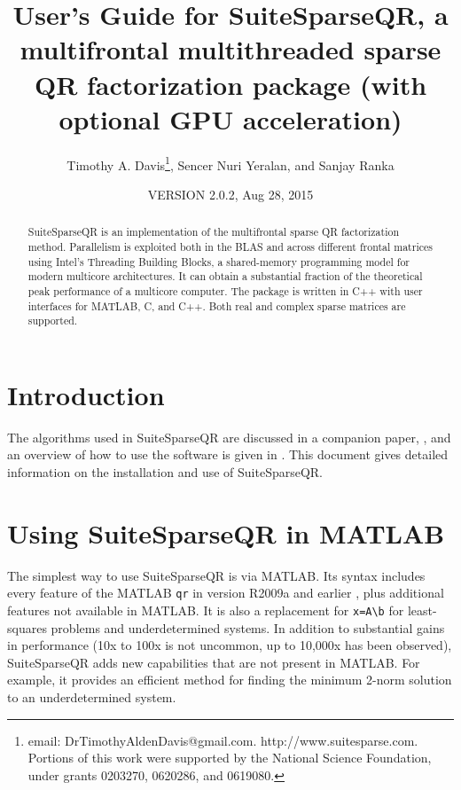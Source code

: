 \documentclass[12pt]{article}
\title{User's Guide for SuiteSparseQR, a multifrontal multithreaded sparse
QR factorization package (with optional GPU acceleration)}
\author{Timothy A. Davis\thanks{
email: DrTimothyAldenDavis@gmail.com.
http://www.suitesparse.com.
Portions of this work were supported by the National
Science Foundation, under grants 0203270, 0620286, and 0619080.},
Sencer Nuri Yeralan, and Sanjay Ranka}
\date{VERSION 2.0.2, Aug 28, 2015}
\begin{document}
\maketitle

\begin{abstract}

SuiteSparseQR is an implementation of the multifrontal sparse QR factorization
method.  Parallelism is exploited both in the BLAS and across different frontal
matrices using Intel's Threading Building Blocks, a shared-memory programming
model for modern multicore architectures.  It can obtain a substantial fraction
of the theoretical peak performance of a multicore computer.  The package is
written in C++ with user interfaces for MATLAB, C, and C++.  Both real and
complex sparse matrices are supported.

\end{abstract}

\maketitle

\section{Introduction}
\label{intro}

The algorithms used in SuiteSparseQR are discussed in a companion paper,
\cite{Davis08a}, and an overview of how to use the software is given in
\cite{Davis08b}.  This document gives detailed information on the installation
and use of SuiteSparseQR.

\section{Using SuiteSparseQR in MATLAB}

The simplest way to use SuiteSparseQR is via MATLAB.  Its syntax includes every
feature of the MATLAB \verb'qr' in version R2009a and earlier
\cite{GilbertMolerSchreiber}, plus additional features not available in MATLAB.
It is also a replacement for \verb'x=A\b' for least-squares problems and
underdetermined systems.  In addition to substantial gains in performance (10x
to 100x is not uncommon, up to 10,000x has been observed), SuiteSparseQR adds
new capabilities that are not present in MATLAB.  For example, it provides an
efficient method for finding the minimum 2-norm solution to an underdetermined
system.
\end{document}
